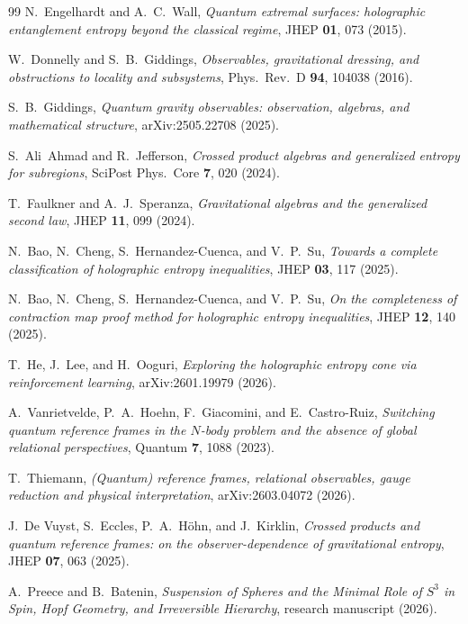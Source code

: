 \documentclass[11pt,a4paper]{article}
\theoremstyle{definition}
\theoremstyle{remark}
\newcommand{\Sthree}{S^{3}}
\begin{document}
\begin{thebibliography}{99}
N.~Engelhardt and A.~C.~Wall, \emph{Quantum extremal surfaces: holographic entanglement
entropy beyond the classical regime}, JHEP \textbf{01}, 073 (2015).

W.~Donnelly and S.~B.~Giddings, \emph{Observables, gravitational dressing, and obstructions to
locality and subsystems}, Phys.\ Rev.\ D \textbf{94}, 104038 (2016).

S.~B.~Giddings, \emph{Quantum gravity observables: observation, algebras, and mathematical
structure}, arXiv:2505.22708 (2025).

S.~Ali~Ahmad and R.~Jefferson, \emph{Crossed product algebras and generalized entropy for
subregions}, SciPost Phys.\ Core \textbf{7}, 020 (2024).

T.~Faulkner and A.~J.~Speranza, \emph{Gravitational algebras and the generalized second law},
JHEP \textbf{11}, 099 (2024).

N.~Bao, N.~Cheng, S.~Hernandez-Cuenca, and V.~P.~Su, \emph{Towards a complete classification
of holographic entropy inequalities}, JHEP \textbf{03}, 117 (2025).

N.~Bao, N.~Cheng, S.~Hernandez-Cuenca, and V.~P.~Su, \emph{On the completeness of contraction
map proof method for holographic entropy inequalities}, JHEP \textbf{12}, 140 (2025).

T.~He, J.~Lee, and H.~Ooguri, \emph{Exploring the holographic entropy cone via reinforcement
learning}, arXiv:2601.19979 (2026).

A.~Vanrietvelde, P.~A.~Hoehn, F.~Giacomini, and E.~Castro-Ruiz, \emph{Switching quantum
reference frames in the $N$-body problem and the absence of global relational perspectives},
Quantum \textbf{7}, 1088 (2023).

T.~Thiemann, \emph{(Quantum) reference frames, relational observables, gauge reduction and
physical interpretation}, arXiv:2603.04072 (2026).

J.~De Vuyst, S.~Eccles, P.~A.~H\"ohn, and J.~Kirklin, \emph{Crossed products and
quantum reference frames: on the observer-dependence of gravitational entropy}, JHEP
\textbf{07}, 063 (2025).


A.~Preece and B.~Batenin, \emph{Suspension of Spheres and the Minimal Role of $\Sthree$ in
Spin, Hopf Geometry, and Irreversible Hierarchy}, research manuscript (2026).


\end{thebibliography}
\end{document}
